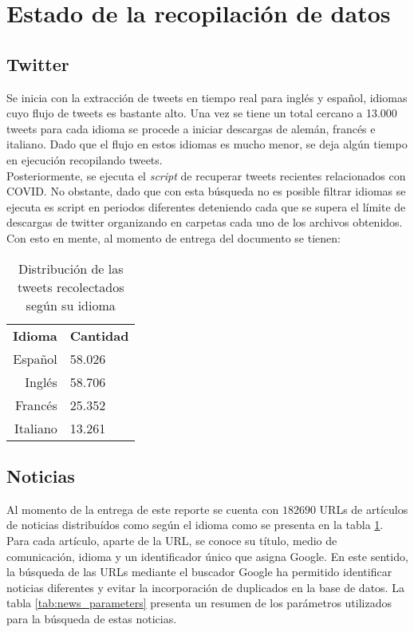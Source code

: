 \section{Estado de la recopilación de datos}

\subsection{Twitter}
Se inicia con la extracción de tweets en tiempo real para inglés y español, idiomas cuyo flujo de tweets es bastante alto. Una vez se tiene un total cercano a 13.000 tweets para cada idioma se procede a iniciar descargas de alemán, francés e italiano. Dado que el flujo en estos idiomas es mucho menor, se deja algún tiempo en ejecución recopilando tweets.\\

Posteriormente, se ejecuta el \textit{script} de recuperar tweets recientes relacionados con COVID. No obstante, dado que con esta búsqueda no es posible filtrar idiomas se ejecuta es script en periodos diferentes deteniendo cada que se supera el límite de descargas de twitter organizando en carpetas cada uno de los archivos obtenidos. Con esto en mente, al momento de entrega del documento se tienen:
\begin{table}[h]
    \centering
    \begin{tabular}{r|l}
        \textbf{Idioma} & \textbf{Cantidad} \\
        Español & 58.026 \\
        Inglés & 58.706 \\
        Francés & 25.352 \\
        Italiano & 13.261
    \end{tabular}
    \caption{Distribución de las tweets recolectados según su idioma}
    \label{tab:news_results}
\end{table}

\subsection{Noticias}
Al momento de la entrega de este reporte se cuenta con $182690$ URLs de artículos de noticias distribuídos como según el idioma como se presenta en la tabla \ref{tab:news_results}. Para cada artículo, aparte de la URL, se conoce su título, medio de comunicación, idioma y un identificador único que asigna Google. En este sentido, la búsqueda de las URLs mediante el buscador Google ha permitido identificar noticias diferentes y evitar la incorporación de duplicados en la base de datos. La tabla \ref{tab:news_parameters} presenta un resumen de los parámetros utilizados para la búsqueda de estas noticias.

